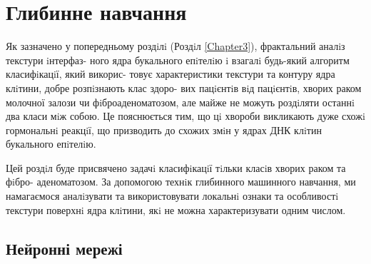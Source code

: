 
\chapter{Глибинне навчання} %

\label{Chapter4} %

Як зазначено у попередньому роздiлi (Роздiл \ref{Chapter3}), фрактальний аналiз текстури iнтерфаз- ного ядра букального епiтелiю i взагалi будь-який алгоритм класифiкацiї, який викорис- товує характеристики текстури та контуру ядра клiтини, добре розпiзнають клас здоро- вих пацiєнтiв вiд пацiєнтiв, хворих раком молочної залози чи фiброаденоматозом, але майже не можуть роздiляти останнi два класи мiж собою. Це пояснюється тим, що цi хвороби викликають дуже схожi гормональнi реакцiї, що призводить до схожих змiн у ядрах ДНК клiтин букального епiтелiю.

Цей роздiл буде присвячено задачi класифiкацiї тiльки класiв хворих раком та фiбро- аденоматозом. За допомогою технiк глибинного машинного навчання, ми намагаємося аналiзувати та використовувати локальнi ознаки та особливостi текстури поверхнi ядра клiтини, якi не можна характеризувати одним числом. 


\section{Нейронні мережі}

